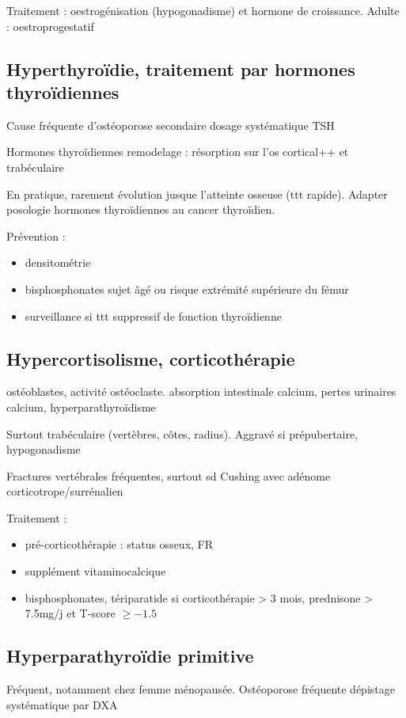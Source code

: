 \documentclass[11pt]{article}
\begin{document}
Traitement : oestrogénisation (hypogonadisme) et hormone de croissance. Adulte :
oestroprogestatif

\subsection{Hyperthyroïdie, traitement par hormones thyroïdiennes}
\label{sec:org9da48b7}
Cause fréquente d'ostéoporose secondaire \thus dosage systématique TSH

Hormones thyroïdiennes \inc remodelage : résorption sur l'os cortical++ et trabéculaire

En pratique, rarement évolution jusque l'atteinte osseuse (ttt
rapide). Adapter posologie hormones thyroïdiennes au cancer thyroïdien.

Prévention :
\begin{itemize}
\item densitométrie
\item bisphosphonates sujet âgé ou risque extrémité supérieure du fémur
\item surveillance si ttt suppressif de fonction thyroïdienne
\end{itemize}

\subsection{Hypercortisolisme, corticothérapie}
\label{sec:org79a0d68}

\dec ostéoblastes, \inc activité ostéoclaste. \dec absorption intestinale
calcium, \inc pertes urinaires calcium, hyperparathyroïdisme

Surtout trabéculaire (vertèbres, côtes, radius). Aggravé si prépubertaire, hypogonadisme

Fractures vertébrales fréquentes, surtout sd Cushing avec adénome corticotrope/surrénalien

Traitement : 
\begin{itemize}
\item pré-corticothérapie : status osseux, FR
\item supplément vitaminocalcique
\item bisphosphonates, tériparatide si corticothérapie > 3 mois, prednisone > 7.5mg/j
et T-score \(\ge -1.5\)
\end{itemize}

\subsection{Hyperparathyroïdie primitive}
\label{sec:orga944874}
Fréquent, notamment chez femme ménopausée. Ostéoporose fréquente \thus dépistage
systématique par DXA
\end{document}

